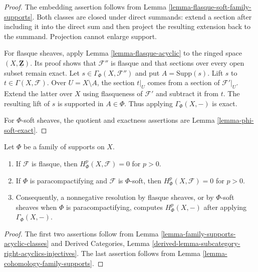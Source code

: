 \begin{proof}
The embedding assertion follows from Lemma
\ref{lemma-flasque-soft-family-supports}. Both classes are closed under
direct summands: extend a section after including it into the direct sum
and then project the resulting extension back to the summand. Projection
cannot enlarge support.

For flasque sheaves, apply Lemma \ref{lemma-flasque-acyclic} to the
ringed space $(X, \underline{\mathbf{Z}})$. Its proof shows that
$\mathcal{F}''$ is flasque and that sections over every open subset remain
exact. Let $s \in \Gamma_\Phi(X,\mathcal{F}'')$ and put
$A = \text{Supp}(s)$. Lift $s$ to
$t \in \Gamma(X,\mathcal{F})$. Over $U = X \setminus A$, the section
$t|_U$ comes from a section of $\mathcal{F}'|_U$. Extend the latter over
$X$ using flasqueness of $\mathcal{F}'$ and subtract it from $t$.
The resulting lift of $s$ is supported in $A \in \Phi$. Thus applying
$\Gamma_\Phi(X,-)$ is exact.

For $\Phi$-soft sheaves, the quotient and exactness assertions are
Lemma \ref{lemma-phi-soft-exact}.
\end{proof}

\begin{lemma}
\label{lemma-family-supports-flasque-soft-acyclic}
\begin{reference}
\cite[Chapter III, \S 3.3, Corollary to Proposition 3.3.2,
p. 159]{Tohoku}
\end{reference}
Let $\Phi$ be a family of supports on $X$.
\begin{enumerate}
\item If $\mathcal{F}$ is flasque, then
$H^p_\Phi(X,\mathcal{F}) = 0$ for $p > 0$.
\item If $\Phi$ is paracompactifying and $\mathcal{F}$ is
$\Phi$-soft, then $H^p_\Phi(X,\mathcal{F}) = 0$ for $p > 0$.
\item Consequently, a nonnegative resolution by flasque sheaves, or by
$\Phi$-soft sheaves when $\Phi$ is paracompactifying, computes
$H^p_\Phi(X,-)$ after applying $\Gamma_\Phi(X,-)$.
\end{enumerate}
\end{lemma}

\begin{proof}
The first two assertions follow from Lemma
\ref{lemma-family-supports-acyclic-classes} and Derived Categories,
Lemma \ref{derived-lemma-subcategory-right-acyclics-injectives}.
The last assertion follows from Lemma
\ref{lemma-cohomology-family-supports}.
\end{proof}


